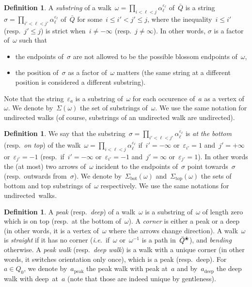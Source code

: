 \documentclass{amsart}
\theoremstyle{definition}
\newtheorem{definition}[theorem]{Definition}
\newcommand{\ie}{\textit{i.e.}~} %
\newcommand{\darkblue}{\color{darkblue}} %
\newcommand{\defn}[1]{\textsl{\darkblue #1}} %
\newcommand{\blossom}{^\text{\ding{96}}} %
\newcommand{\peak}{\mathrm{peak}} %
\newcommand{\deep}{\mathrm{deep}} %
\renewcommand{\top}{\mathrm{top}} %
\newcommand{\bottom}{\mathrm{bot}} %
\begin{document}
\begin{definition}
\label{def:substrings}
A \defn{substring} of a walk~$\omega = \prod_{i < \ell < j} \alpha_\ell^{\varepsilon_\ell}$ of~$\bar Q$ is a string~$\sigma = \prod_{i' < \ell < j'} \alpha_\ell^{\varepsilon_\ell}$ of~$\bar Q$ for some~$i \le i' < j' \le j$, where the inequality~$i \le i'$ (resp.~$j' \le j$) is strict when~$i \ne -\infty$ (resp.~$j \ne \infty$). In other words, $\sigma$ is a factor of~$\omega$ such that
\begin{itemize}
\item the endpoints of~$\sigma$ are not allowed to be the possible blossom endpoints of~$\omega$,
\item the position of~$\sigma$ as a factor of~$\omega$ matters (the same string at a different position is considered a different substring).
\end{itemize}
Note that the string~$\varepsilon_a$ is a substring of~$\omega$ for each occurence of~$a$ as a vertex of~$\omega$.
We denote by~$\Sigma(\omega)$ the set of substrings of~$\omega$.
We use the same notation for undirected walks (of course, substrings of an undirected walk are undirected).
\end{definition}

\begin{definition}
\label{def:topBottom}
We say that the substring~$\sigma = \prod_{i' < \ell < j'} \alpha_\ell^{\varepsilon_\ell}$ is \defn{at the bottom} (resp.~\defn{on top}) of the walk~$\omega = \prod_{i < \ell < j} \alpha_\ell^{\varepsilon_\ell}$ if~$i'=-\infty$ or~$\varepsilon_{i'} = 1$ and~$j'=+\infty$ or~$\varepsilon_{j'} = -1$ (resp.~if~$i'=-\infty$ or~$\varepsilon_{i'} = -1$ and~$j'=\infty$ or~$\varepsilon_{j'} = 1$).
In other words the (at most) two arrows of~$\omega$ incident to the endpoints of~$\sigma$ point towards~$\sigma$ (resp.~outwards from~$\sigma$).
We denote by~$\Sigma_\bottom(\omega)$ and~$\Sigma_\top(\omega)$ the sets of bottom and top substrings of~$\omega$ respectively.
We use the same notations for undirected~walks.
\end{definition}

\begin{definition}
\label{def:straightBending}
A \defn{peak} (resp.~\defn{deep}) of a walk~$\omega$ is a substring of~$\omega$ of length zero which is on top (resp.~at the bottom of~$\omega$).
A \defn{corner} is either a peak or a deep (in other words, it is a vertex of~$\omega$ where the arrows change direction).
A walk~$\omega$ is \defn{straight} if it has no corner (\ie if~$\omega$ or~$\omega^{-1}$ is a path in~$\bar Q\blossom$), and \defn{bending} otherwise.
A \defn{peak walk} (resp.~\defn{deep walk}) is a walk with a unique corner (in other words, it switches orientation only once), which is a peak (resp.~deep). For~$a \in Q_0$, we denote by~$a_\peak$ the peak walk with peak at~$a$ and by~$a_\deep$ the deep walk with deep~at~$a$ (note that those are indeed unique by gentleness).
\end{definition}
\end{document}
